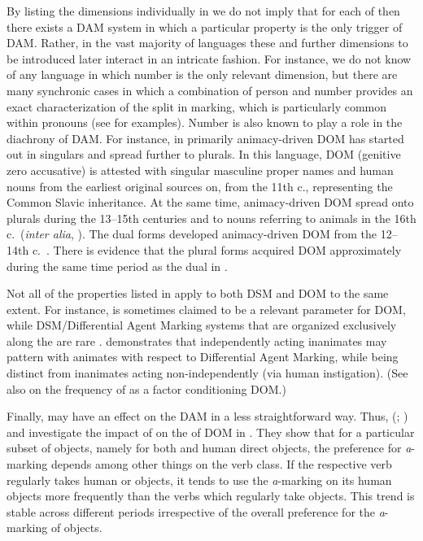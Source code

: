 \documentclass[output=paper]{LSP/langsci}
\begin{document}
By listing the dimensions individually in  we do not imply that for each of then there exists a DAM system in which a particular property is the only trigger of DAM. 
Rather, in the vast majority of languages these and further dimensions to be introduced later interact in an intricate fashion. 
For instance, we do not know of any language in which number is the only relevant dimension, but there are many synchronic cases in which a combination of person and number provides an exact characterization of the split in marking, which is particularly common within pronouns (see \citealt{Bickeletal2015Typological} for examples). 
Number is also known to play a role in the diachrony of DAM. 
For instance, in  primarily animacy-driven DOM has started out in singulars and spread further to plurals. 
In this language, DOM (genitive \vs zero accusative) is attested with singular masculine proper names and human nouns from the earliest original  sources on, \ie from the 11th c., representing the Common Slavic inheritance. 
At the same time, animacy-driven DOM spread onto plurals during the 13–15th centuries and to nouns referring to animals in the 16th c.\, (\textit{inter alia}, \citealt[61]{Krysko1994Razvitie}). 
The dual forms developed animacy-driven DOM from the 12–14th c.\ \citep[98]{Krysko1994Razvitie}. 
There is evidence that the plural forms acquired DOM approximately during the same time period as the dual in . 

Not all of the properties listed in  apply to both DSM and DOM to the same extent. 
For instance,  is sometimes claimed to be a relevant parameter for DOM, while DSM/Differential Agent Marking systems that are organized exclusively along the  are rare \citep{Fauconnier2011Differential}. 
\citet{Fauconnier2011Differential} demonstrates that independently acting inanimates may pattern with animates with respect to Differential Agent Marking, while being distinct from inanimates acting non-independently (via human instigation). 
(See also \citealt{Sinnemki2014Typological} on the frequency of  as a factor conditioning DOM.)

Finally,  may have an effect on the DAM in a less straightforward way. 
Thus, \citeauthor{vonHeusingeretal2007Differential} (\citeyear{vonHeusingeretal2007Differential}; \citeyear{vonHeusingeretal2011Affectedness}) and \citet{vonHeusinger2008Verbal} investigate the impact of  on the  of DOM in . 
They show that for a particular subset of objects, namely for both  and  human direct objects, the preference for \textit{a}-marking depends among other things on the verb class. 
If the respective verb regularly takes human or  objects, it tends to use the \textit{a}-marking on its human objects more frequently than the verbs which regularly take  objects. 
This trend is stable across different periods irrespective of the overall preference for the \textit{a}-marking of objects.
\end{document}
